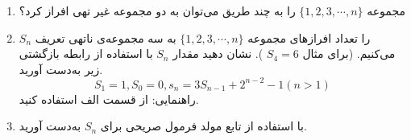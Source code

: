     \p 
\begin{enumerate}
\item
مجموعه
$\{1, 2, 3, \cdots, n\}$
را به چند طریق می‌توان به دو مجموعه غیر تهی افراز کرد؟
\item
$S_n$
را تعداد افرازهای مجموعه
$\{1, 2, 3, \cdots, n\}$
به سه مجموعه‌ی ناتهی تعریف می‌کنیم. (برای مثال
$S_4 = 6$
). نشان دهید مقدار
$S_n$
با استفاده از رابطه بازگشتی زیر به‌دست آورید.
$$S_1 = 1, S_0 = 0, s_n = 3S_{n-1} + 2^{n-2} - 1 (n > 1)$$
راهنمایی: از قسمت الف استفاده کنید.
\item
با استفاده از تابع مولد فرمول صریحی برای
$S_n$
به‌دست آورید.
\end{enumerate}